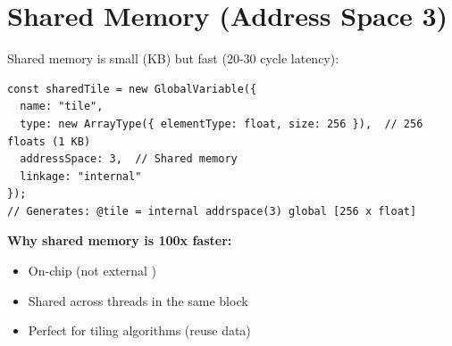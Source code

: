\section{Shared Memory (Address Space 3)}

Shared memory is small (KB) but fast (20-30 cycle latency):

\begin{lstlisting}[style=ts]
const sharedTile = new GlobalVariable({
  name: "tile",
  type: new ArrayType({ elementType: float, size: 256 }),  // 256 floats (1 KB)
  addressSpace: 3,  // Shared memory
  linkage: "internal"
});
// Generates: @tile = internal addrspace(3) global [256 x float]
\end{lstlisting}

\textbf{Why shared memory is 100x faster:}
\begin{itemize}[noitemsep]
  \item On-chip  (not external )
  \item Shared across threads in the same block
  \item Perfect for tiling algorithms (reuse data)
\end{itemize}

